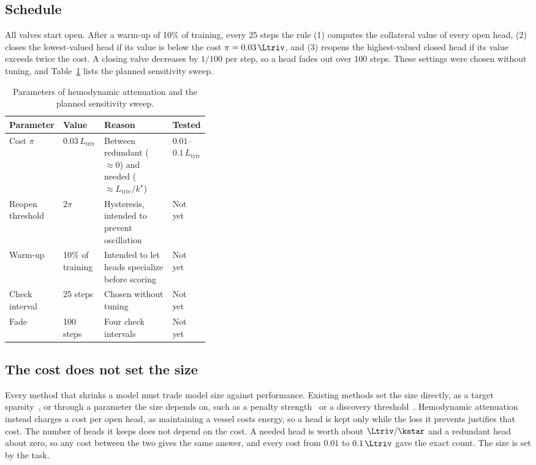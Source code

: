 \subsection{Schedule}

All valves start open. After a warm-up of 10\% of training, every 25 steps the rule (1) computes the collateral value of every open head, (2) closes the lowest-valued head if its value is below the cost $\pi=0.03\,\Ltriv$, and (3) reopens the highest-valued closed head if its value exceeds twice the cost. A closing valve decreases by $1/100$ per step, so a head fades out over 100 steps. These settings were chosen without tuning, and Table~\ref{tab:ha-params} lists the planned sensitivity sweep.

\begin{table}[hbt]
  \centering
  \footnotesize
  \caption{Parameters of hemodynamic attenuation and the planned sensitivity sweep.}
  \label{tab:ha-params}
  \begin{tabular}{@{}llp{0.38\linewidth}l@{}}
    \toprule
    Parameter & Value & Reason & Tested \\
    \midrule
    Cost $\pi$ & $0.03\,L_{\text{triv}}$ & Between redundant ($\approx 0$) and needed ($\approx L_{\text{triv}}/k^\star$) & $0.01$--$0.1\,L_{\text{triv}}$ \\
    Reopen threshold & $2\pi$ & Hysteresis, intended to prevent oscillation & Not yet \\
    Warm-up & 10\% of training & Intended to let heads specialize before scoring & Not yet \\
    Check interval & 25 steps & Chosen without tuning & Not yet \\
    Fade & 100 steps & Four check intervals & Not yet \\
    \bottomrule
  \end{tabular}
\end{table}

\subsection{The cost does not set the size}

Every method that shrinks a model must trade model size against performance. Existing methods set the size directly, as a target sparsity~\citep{zhu2017prune}, or through a parameter the size depends on, such as a penalty strength~\citep{voita2019analyzing} or a discovery threshold~\citep{conmy2023towards}. Hemodynamic attenuation instead charges a cost per open head, as maintaining a vessel costs energy, so a head is kept only while the loss it prevents justifies that cost. The number of heads it keeps does not depend on the cost. A needed head is worth about $\Ltriv/\kstar$ and a redundant head about zero, so any cost between the two gives the same answer, and every cost from $0.01$ to $0.1\,\Ltriv$ gave the exact count. The size is set by the task.

